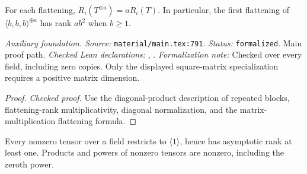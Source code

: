 \renewcommand{\thetheorem}{A52}
\begin{lemma}
\label{aux:flattening-repeated-blocks}
\leanok
For each flattening, $R_i(T^{\oplus a})=aR_i(T)$. In particular, the first flattening of $\langle b,b,b\rangle^{\oplus a}$ has rank $ab^2$ when $b\ge1$.
\end{lemma}

\noindent\textit{Auxiliary foundation. Source:} \texttt{material/main.tex:791}.
\textit{Status:} \texttt{formalized}. Main proof path.
\textit{Checked Lean declarations:} , .
\textit{Formalization note:} Checked over every field, including zero copies. Only the displayed square-matrix specialization requires a positive matrix dimension.

\begin{proof}
\leanok
{}
\textit{Checked proof.} Use the diagonal-product description of repeated blocks, flattening-rank multiplicativity, diagonal normalization, and the matrix-multiplication flattening formula.
\end{proof}

\renewcommand{\thetheorem}{A53}
\begin{lemma}
\label{aux:nonzero-unit-restriction}
\leanok
Every nonzero tensor over a field restricts to $\langle1\rangle$, hence has asymptotic rank at least one. Products and powers of nonzero tensors are nonzero, including the zeroth power.
\end{lemma}

